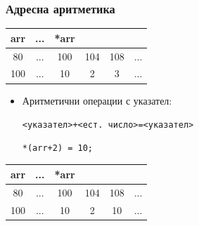 \documentclass{beamer}
\begin{document}
\begin{frame}[fragile]
\frametitle{Адресна аритметика}


\begin{tabular} {c | c | c | c | c | c }

arr &... &*arr \\\hline
80  &... & 100 & 104 & 108 &... \\\hline
100 &... & 10   & 2   & 3   &... \\\hline
  
\end{tabular}


\begin{itemize}
  \item Аритметични операции с указател:   

\texttt{<указател>+<ест. число>=<указател>}
\begin{flushleft}
\begin{lstlisting}
*(arr+2) = 10;
\end{lstlisting}
\end{flushleft}

\end{itemize}

\pause
\begin{tabular} {c | c | c | c | c | c }

arr &... &*arr \\\hline
80  &... & 100 & 104 & 108 &... \\\hline
100 &... & 10   & 2   & \alert{10}   &... \\\hline
  
\end{tabular}

\end{frame}
\end{document}
